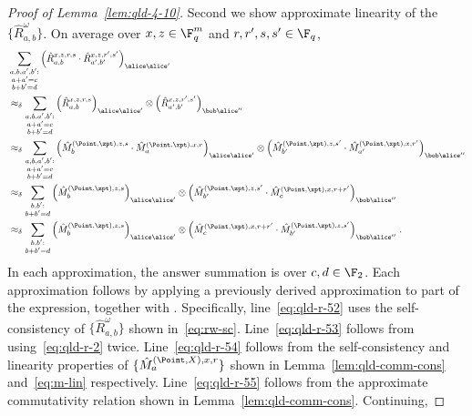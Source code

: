 \begin{proof}[Proof of Lemma~\ref{lem:qld-4-10}]
	Second we show approximate linearity of the $\{ \hat{R}^\omega_{a,b} \}$. On average over $x,z \in \F_q^m$ and $r,r',s,s' \in \F_q$, 
	\begin{align}
	& \sum_{\substack{a,b,a',b' : \\ a + a' = c \\ b + b' = d}} \Big (\hat{R}^{x,z,r,s}_{a,b} \cdot \hat{R}^{x,z,r',s'}_{a',b'} \Big)_{\alice \alice'} \notag\\
	&\approx_\delta \sum_{\substack{a,b,a',b' : \\ a + a' = c \\ b + b' = d}} \Big( \hat{R}^{x,z,r,s}_{a,b} \Big)_{\alice \alice'} \otimes \Big( \hat{R}^{x,z,r',s'}_{a',b'} \Big)_{\bob \alice''} \label{eq:qld-r-52} \\
		&\approx_\delta \sum_{\substack{a,b,a',b': \\ a + a' = c \\ b + b' = d}} \Big( \hat{M}^{(\Point,\zpt),z,s}_{b} \cdot \hat{M}^{(\Point,\xpt),x,r}_{a}
 \Big)_{\alice \alice'} \otimes \Big(\hat{M}^{(\Point,\zpt),z,s'}_{b'} \cdot \hat{M}^{(\Point,\xpt),x,r'}_{a'} \Big)_{\bob \alice''} \label{eq:qld-r-53} \\
 	&\approx_\delta \sum_{\substack{b,b': \\ b + b' = d}} \Big( \hat{M}^{(\Point,\zpt),z,s}_{b}
 \Big)_{\alice \alice'} \otimes \Big(\hat{M}^{(\Point,\zpt),z,s'}_{b'} \cdot \hat{M}^{(\Point,\xpt),x,r+r'}_{c} \Big)_{\bob \alice''} \label{eq:qld-r-54} \\
 &\approx_\delta \sum_{\substack{b,b' : \\ b + b' = d}} \Big( \hat{M}^{(\Point,\zpt),z,s}_{b}
 \Big)_{\alice \alice'} \otimes \Big(\hat{M}^{(\Point,\xpt),x,r+r'}_{c} \cdot \hat{M}^{(\Point,\zpt),z,s'}_{b'}  \Big)_{\bob \alice''} \;.\label{eq:qld-r-55}
 \end{align}
	In each approximation, the answer summation is over $c,d \in \F_2$. Each approximation follows by applying a previously derived approximation to part of the expression, together with . Specifically, line~\eqref{eq:qld-r-52} uses the self-consistency of $\{ \hat{R}^\omega_{a,b} \}$ shown in~\eqref{eq:rw-sc}. Line~\eqref{eq:qld-r-53} follows from using~\eqref{eq:qld-r-2} twice. Line~\eqref{eq:qld-r-54} follows from the self-consistency and linearity properties of $\{ \hat{M}^{(\Point,X),x,r}_a \}$ shown in Lemma~\ref{lem:qld-comm-cons} and~\eqref{eq:m-lin} respectively. Line~\eqref{eq:qld-r-55} follows from the approximate commutativity relation shown in Lemma~\ref{lem:qld-comm-cons}.  Continuing,

\end{proof}
